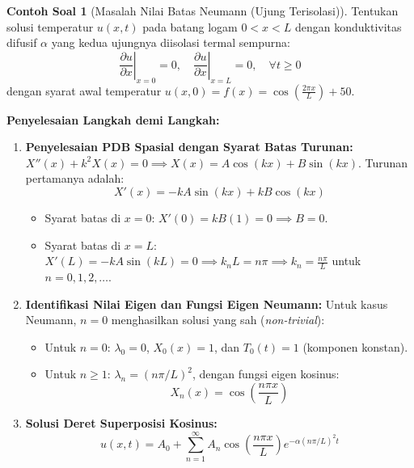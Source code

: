 \documentclass[11pt,a4paper]{article}
\theoremstyle{definition}
\newtheorem{example}{Contoh Soal}[section]
\begin{document}
\begin{example}[Masalah Nilai Batas Neumann (Ujung Terisolasi)]
Tentukan solusi temperatur $u(x, t)$ pada batang logam $0 < x < L$ dengan konduktivitas difusif $\alpha$ yang kedua ujungnya diisolasi termal sempurna:
\begin{equation*}
    \left. \frac{\partial u}{\partial x} \right|_{x=0} = 0, \quad \left. \frac{\partial u}{\partial x} \right|_{x=L} = 0, \quad \forall t \ge 0
\end{equation*}
dengan syarat awal temperatur $u(x, 0) = f(x) = \cos\left(\frac{2\pi x}{L}\right) + 50$.
\end{example}

\noindent\textbf{Penyelesaian Langkah demi Langkah:}
\begin{enumerate}[leftmargin=*]
    \item \textbf{Penyelesaian PDB Spasial dengan Syarat Batas Turunan:}
    $X''(x) + k^2 X(x) = 0 \implies X(x) = A \cos(kx) + B \sin(kx)$.
    Turunan pertamanya adalah:
    \begin{equation*}
        X'(x) = -k A \sin(kx) + k B \cos(kx)
    \end{equation*}
    \begin{itemize}[leftmargin=*]
        \item Syarat batas di $x = 0$: $X'(0) = k B(1) = 0 \implies B = 0$.
        \item Syarat batas di $x = L$: $X'(L) = -k A \sin(kL) = 0 \implies k_n L = n\pi \implies k_n = \frac{n\pi}{L}$ untuk $n = 0, 1, 2, \dots$.
    \end{itemize}
    
    \item \textbf{Identifikasi Nilai Eigen dan Fungsi Eigen Neumann:}
    Untuk kasus Neumann, $n = 0$ menghasilkan solusi yang sah (\textit{non-trivial}):
    \begin{itemize}[leftmargin=*]
        \item Untuk $n = 0$: $\lambda_0 = 0$, $X_0(x) = 1$, dan $T_0(t) = 1$ (komponen konstan).
        \item Untuk $n \ge 1$: $\lambda_n = (n\pi/L)^2$, dengan fungsi eigen kosinus:
        \begin{equation*}
            X_n(x) = \cos\left(\frac{n\pi x}{L}\right)
        \end{equation*}
    \end{itemize}
    
    \item \textbf{Solusi Deret Superposisi Kosinus:}
    \begin{equation*}
        u(x, t) = A_0 + \sum_{n=1}^{\infty} A_n \cos\left(\frac{n\pi x}{L}\right) e^{-\alpha (n\pi/L)^2 t}
    \end{equation*}
    

\end{enumerate}
\end{document}
